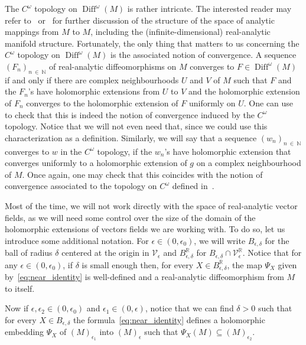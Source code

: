 \documentclass[AHL,Unicode,longabstracts,published]{cedram}
\DeclareMathOperator{\Diff}{Diff}
\newcommand{\clV}{\mathcal{V}}
\newcommand{\bbN}{\mathbb{N}}
\newcommand{\bbR}{\mathbb{R}}
\begin{document}
The $C^\omega$ topology on $\Diff^\omega(M)$ is rather intricate. The interested reader may refer to~\cite{kriegl_michor_real_analytic} or~\cite[Chapter~IX]{kriegl_michor_global_analysis} for further discussion of the structure of the space of analytic mappings from $M$ to $M$, including the (infinite-dimensional) real-analytic manifold structure. Fortunately, the only thing that matters to us concerning the $C^\omega$ topology on $\Diff^\omega(M)$ is the associated notion of convergence. A sequence $(F_n)_{n~\in~\bbN}$ of real-analytic diffeomorphisms on $M$ converges to $F \in \Diff^\omega(M)$ if and only if there are complex neighbourhoods $U$ and $V$ of $M$ such that $F$ and the $F_n$'s have holomorphic extensions from $U$ to $V$ and the holomorphic extension of $F_n$ converges to the holomorphic extension of $F$ uniformly on $U$. One can use~\cite[7.5]{lokalkonvexe} to check that this is indeed the notion of convergence induced by the $C^\omega$ topology. Notice that we will not even need that, since we could use this characterization as a definition. Similarly, we will say that a sequence $(w_n)_{n~\in~\bbN}$ converges to $w$ in the $C^\omega$ topology, if the $w_n$'s have holomorphic extension that converges uniformly to a holomorphic extension of $g$ on a complex neighbourhood of $M$. Once again, one may check that this coincides with the notion of convergence associated to the topology on $C^\omega$ defined in~\cite[\S~3]{kriegl_michor_real_analytic}.

Most of the time, we will not work directly with the space of real-analytic vector fields, as we will need some control over the size of the domain of the holomorphic extensions of vectors fields we are working with. To do so, let us introduce some additional notation. For $\epsilon \in (0,\epsilon_0)$, we will write $B_{\epsilon,\delta}$ for the ball of radius $\delta$ centered at the origin in $\clV_\epsilon$ and $B_{\epsilon,\delta}^{\bbR}$ for $ B_{\epsilon,\delta} \cap \clV_\epsilon^{\bbR}$. Notice that for any $\epsilon \in (0,\epsilon_0)$, if $\delta$ is small enough then, for every $X \in B_{\epsilon,\delta}^{\bbR}$, the map $\Psi_X$ given by~\eqref{eq:near_identity} is well-defined and a real-analytic diffeomorphism from $M$ to itself.

Now if $\epsilon,\epsilon_2 \in (0, \epsilon_0)$ and $\epsilon_1 \in (0,\epsilon)$, notice that we can find $\delta > 0$ such that for every $X \in B_{\epsilon,\delta}$ the formula~\eqref{eq:near_identity} defines a holomorphic embedding $\Psi_X$ of $(M)_{\epsilon_1}$ into $(M)_\epsilon$ such that $\Psi_X(M) \subseteq (M)_{\epsilon_2}$.
\end{document}
